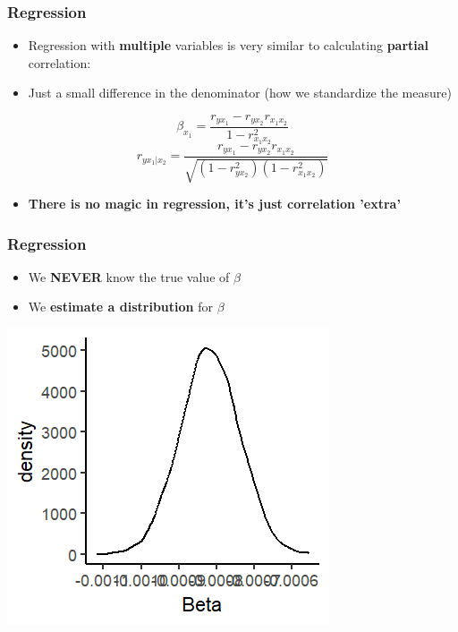 \documentclass[xcolor=x11names,compress]{beamer}\usepackage[]{graphicx}\usepackage[]{color}
\makeatletter
\def\maxwidth{ %
  \ifdim\Gin@nat@width>\linewidth
    \linewidth
  \else
    \Gin@nat@width
  \fi
}
\newenvironment{knitrout}{}{} %
\renewcommand{\(}{\begin{columns}}
\renewcommand{\)}{\end{columns}}
\newcommand{\<}[1]{\begin{column}{#1}}
\renewcommand{\>}{\end{column}}
\makeatother
\begin{document}
\begin{frame}
\frametitle{Regression}
\begin{itemize}
\item Regression with \textbf{multiple} variables is very similar to calculating \textbf{partial} correlation:
\pause
\item Just a small difference in the denominator (how we standardize the measure)
\pause
\end{itemize}
$$\beta_{x_1} = \frac{r_{yx_1} - r_{yx_2}r_{x_1x_2}}{1-r^2_{x_1x_2}}$$
$$r_{yx_1|x_2} = \frac{r_{yx_1} - r_{yx_2}r_{x_1x_2}}{\sqrt{(1-r^2_{yx_2})(1-r^2_{x_1x_2})}}$$
\begin{itemize}
\item \textbf{There is no magic in regression, it's just correlation 'extra'}
\end{itemize}
\end{frame}

\begin{frame}
\frametitle{Regression}
\begin{itemize}
\item We \textbf{NEVER} know the true value of $\beta$
\pause
\item We \textbf{estimate a distribution} for $\beta$
\end{itemize}
\begin{knitrout}
\color{fgcolor}
\includegraphics[width=\maxwidth]{figure/beta_dist-1} 

\end{knitrout}
\end{frame}
\end{document}
